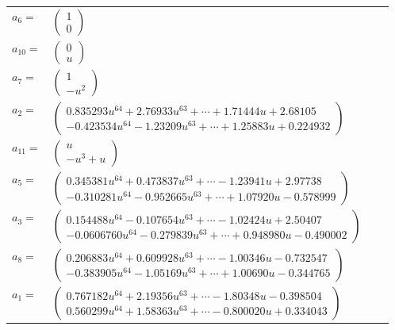 \documentclass[1p]{elsarticle_modified}
\theoremstyle{definition}
\begin{document}
\begin{tabular}{m{7pt} m{180pt} m{7pt} m{180pt} }
\flushright $a_{6}=$&$\begin{pmatrix}1\\0\end{pmatrix}$ \\
\flushright $a_{10}=$&$\begin{pmatrix}0\\u\end{pmatrix}$ \\
\flushright $a_{7}=$&$\begin{pmatrix}1\\- u^2\end{pmatrix}$ \\
\flushright $a_{2}=$&$\begin{pmatrix}0.835293 u^{64}+2.76933 u^{63}+\cdots+1.71444 u+2.68105\\-0.423534 u^{64}-1.23209 u^{63}+\cdots+1.25883 u+0.224932\end{pmatrix}$ \\
\flushright $a_{11}=$&$\begin{pmatrix}u\\- u^3+u\end{pmatrix}$ \\
\flushright $a_{5}=$&$\begin{pmatrix}0.345381 u^{64}+0.473837 u^{63}+\cdots-1.23941 u+2.97738\\-0.310281 u^{64}-0.952665 u^{63}+\cdots+1.07920 u-0.578999\end{pmatrix}$ \\
\flushright $a_{3}=$&$\begin{pmatrix}0.154488 u^{64}-0.107654 u^{63}+\cdots-1.02424 u+2.50407\\-0.0606760 u^{64}-0.279839 u^{63}+\cdots+0.948980 u-0.490002\end{pmatrix}$ \\
\flushright $a_{8}=$&$\begin{pmatrix}0.206883 u^{64}+0.609928 u^{63}+\cdots-1.00346 u-0.732547\\-0.383905 u^{64}-1.05169 u^{63}+\cdots+1.00690 u-0.344765\end{pmatrix}$ \\
\flushright $a_{1}=$&$\begin{pmatrix}0.767182 u^{64}+2.19356 u^{63}+\cdots-1.80348 u-0.398504\\0.560299 u^{64}+1.58363 u^{63}+\cdots-0.800020 u+0.334043\end{pmatrix}$ \\

\end{tabular}
\end{document}
